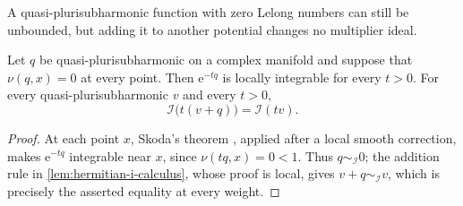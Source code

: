 A quasi-plurisubharmonic function with zero Lelong numbers can still be
unbounded, but adding it to another potential changes no multiplier ideal.

\begin{lemma}\label{lem:zero-lelong-ideal-neutrality}
Let $q$ be quasi-plurisubharmonic on a complex manifold and suppose that
$\nu(q,x)=0$ at every point. Then $\mathrm e^{-tq}$ is locally integrable
for every $t>0$. For every quasi-plurisubharmonic $v$ and every $t>0$,
\[
 \mathcal I\bigl(t(v+q)\bigr)=\mathcal I(tv).
\]
\end{lemma}
\begin{proof}
At each point $x$, Skoda's theorem \cite[Lemma~5.6]{DemAM11}, applied
after a local smooth correction, makes $\mathrm e^{-tq}$ integrable near
$x$, since $\nu(tq,x)=0<1$. Thus $q\sim_{\mathcal I}0$;
the addition rule in \cref{lem:hermitian-i-calculus}, whose proof is local, gives
$v+q\sim_{\mathcal I}v$, which is precisely the asserted equality at every weight.
\end{proof}
